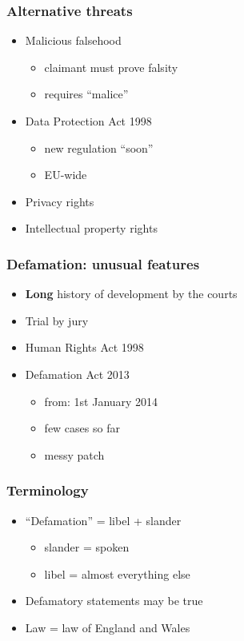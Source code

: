 \documentclass[ignorenonframetext,]{beamer}
\begin{document}
\begin{frame}
  \frametitle{Alternative threats}
  \begin{itemize}
  \item Malicious falsehood
    \begin{itemize}
    \item claimant must prove falsity
    \item requires ``malice''
    \end{itemize}
  \item Data Protection Act 1998
    \begin{itemize}
    \item new regulation ``soon''
    \item EU-wide
    \end{itemize}
  \item Privacy rights
  \item Intellectual property rights
  \end{itemize}
\end{frame}

\begin{frame}
  \frametitle{Defamation: unusual features}
  \begin{itemize}
  \item {\bf Long} history of development by the courts
  \item Trial by jury
  \item Human Rights Act 1998
  \item Defamation Act 2013
    \begin{itemize}
    \item from: 1st January 2014
    \item few cases so far
    \item messy patch
    \end{itemize}
  \end{itemize}
\end{frame}

\begin{frame}
\frametitle{Terminology}

\begin{itemize}
\item ``Defamation'' = libel + slander
  \begin{itemize}
  \item slander = spoken
  \item libel = almost everything else
  \end{itemize}
\item Defamatory statements may be true
\item Law = law of England and Wales
\end{itemize}
\end{frame}
\end{document}
